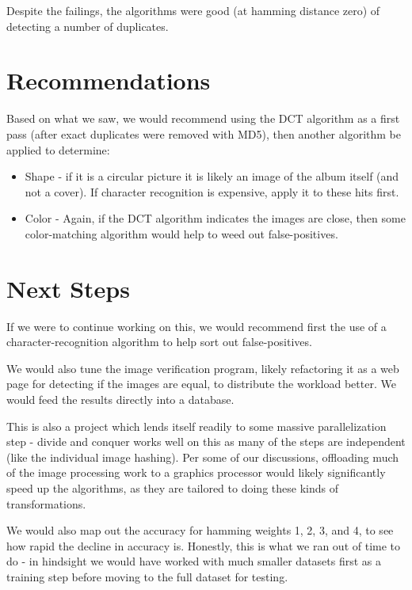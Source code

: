 \documentclass[11pt,a4paper,titlepage]{article}
\begin{document}
Despite the failings, the algorithms were good (at hamming distance zero) of
detecting a number of duplicates.

\section{Recommendations}

Based on what we saw, we would recommend using the DCT algorithm as a first
pass (after exact duplicates were removed with MD5), then another algorithm be
applied to determine:

\begin{itemize}
    \item
        Shape - if it is a circular picture it is likely an image of the album
        itself (and not a cover).  If character recognition is expensive, apply
        it to these hits first.
    \item
        Color - Again, if the DCT algorithm indicates the images are close,
        then some color-matching algorithm would help to weed out
        false-positives.
\end{itemize}

\section{Next Steps}

If we were to continue working on this, we would recommend first the use of a
character-recognition algorithm to help sort out false-positives.

We would also tune the image verification program, likely refactoring it as a
web page for detecting if the images are equal, to distribute the workload
better.  We would feed the results directly into a database.

This is also a project which lends itself readily to some massive
parallelization step - divide and conquer works well on this as many of the
steps are independent (like the individual image hashing).  Per some of our
discussions, offloading much of the image processing work to a graphics
processor would likely significantly speed up the algorithms, as they are
tailored to doing these kinds of transformations.

We would also map out the accuracy for hamming weights 1, 2, 3, and 4, to see
how rapid the decline in accuracy is.  Honestly, this is what we ran out of time
to do - in hindsight we would have worked with much smaller datasets first as a
training step before moving to the full dataset for testing.
\end{document}
